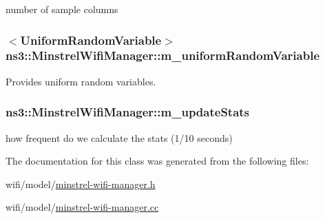 number of sample columns 

\subsubsection[{\texorpdfstring{m\+\_\+uniform\+Random\+Variable}{m_uniformRandomVariable}}]{$<${\bf Uniform\+Random\+Variable}$>$ ns3\+::\+Minstrel\+Wifi\+Manager\+::m\+\_\+uniform\+Random\+Variable\hspace{0.3cm}{\ttfamily [private]}}\hypertarget{classns3_1_1MinstrelWifiManager_a63a489eb04c046ac3fe29b514d5eb028}{}\label{classns3_1_1MinstrelWifiManager_a63a489eb04c046ac3fe29b514d5eb028}


Provides uniform random variables. 

\subsubsection[{\texorpdfstring{m\+\_\+update\+Stats}{m_updateStats}}]{ ns3\+::\+Minstrel\+Wifi\+Manager\+::m\+\_\+update\+Stats\hspace{0.3cm}{\ttfamily [private]}}\hypertarget{classns3_1_1MinstrelWifiManager_abd6d6339afd6875826c0ffa11297ad65}{}\label{classns3_1_1MinstrelWifiManager_abd6d6339afd6875826c0ffa11297ad65}


how frequent do we calculate the stats (1/10 seconds) 



The documentation for this class was generated from the following files\+:\begin{DoxyCompactItemize}
\item 
wifi/model/\hyperlink{minstrel-wifi-manager_8h}{minstrel-\/wifi-\/manager.\+h}\item 
wifi/model/\hyperlink{minstrel-wifi-manager_8cc}{minstrel-\/wifi-\/manager.\+cc}\end{DoxyCompactItemize}
